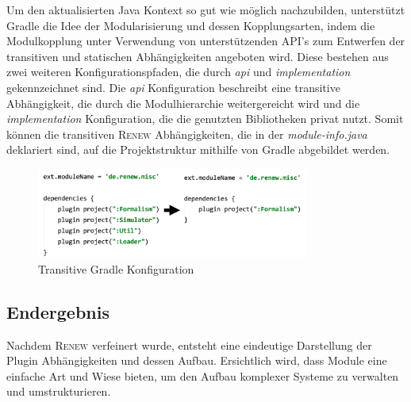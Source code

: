 	Um den aktualisierten Java Kontext so gut wie möglich nachzubilden, unterstützt Gradle die Idee der  Modularisierung und dessen Kopplungsarten, indem die Modulkopplung unter Verwendung von unterstützenden API's zum Entwerfen der transitiven und statischen Abhängigkeiten angeboten wird. Diese bestehen aus zwei weiteren Konfigurationspfaden, die durch \textit{api} und \textit{implementation} gekennzeichnet sind. Die \textit{api} Konfiguration beschreibt eine transitive Abhängigkeit, die durch die Modulhierarchie weitergereicht wird und die \textit{implementation} Konfiguration, die die genutzten Bibliotheken privat nutzt. Somit können die transitiven \textsc{Renew} Abhängigkeiten, die in der \textit{module-info.java} deklariert sind, auf die Projektstruktur mithilfe von Gradle abgebildet werden.

	\begin{figure}[h!]
	  \centering
	  \includegraphics[width=0.8\textwidth]{material/images/gradle_misc.png}
	  \caption{Transitive Gradle Konfiguration}
	  \label{fig:trans_gradle}
	\end{figure}

\subsection{Endergebnis} \label{sub:endergebnis}
	Nachdem \textsc{Renew} verfeinert wurde, entsteht eine eindeutige Darstellung der Plugin Abhängigkeiten und dessen Aufbau. Ersichtlich wird, dass Module eine einfache Art und Wiese bieten, um den Aufbau komplexer Systeme zu verwalten und umstrukturieren.

